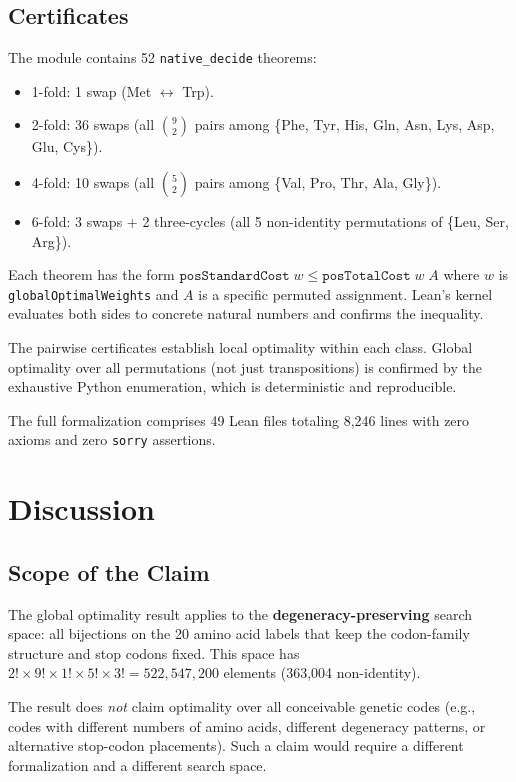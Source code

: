 \documentclass[11pt,twocolumn]{article}
\begin{document}
\subsection{Certificates}

The module contains 52 \texttt{native\_decide} theorems:
\begin{itemize}
\item 1-fold: 1 swap (Met $\leftrightarrow$ Trp).
\item 2-fold: 36 swaps (all $\binom{9}{2}$ pairs among \{Phe, Tyr,
  His, Gln, Asn, Lys, Asp, Glu, Cys\}).
\item 4-fold: 10 swaps (all $\binom{5}{2}$ pairs among \{Val, Pro, Thr,
  Ala, Gly\}).
\item 6-fold: 3 swaps + 2 three-cycles (all 5 non-identity permutations
  of \{Leu, Ser, Arg\}).
\end{itemize}
Each theorem has the form
$\texttt{posStandardCost}\; w \leq \texttt{posTotalCost}\; w\; A$
where $w$ is \texttt{globalOptimalWeights} and $A$ is a specific
permuted assignment. Lean's kernel evaluates both sides to concrete
natural numbers and confirms the inequality.

The pairwise certificates establish local optimality within each class.
Global optimality over all permutations (not just transpositions) is
confirmed by the exhaustive Python enumeration, which is deterministic
and reproducible.

The full formalization comprises 49 Lean files totaling 8,246 lines
with zero axioms and zero \texttt{sorry} assertions.

\section{Discussion}

\subsection{Scope of the Claim}

The global optimality result applies to the
\textbf{degeneracy-preserving} search space: all bijections on the 20
amino acid labels that keep the codon-family structure and stop codons
fixed. This space has $2! \times 9! \times 1! \times 5! \times 3! =
522{,}547{,}200$ elements (363,004 non-identity).

The result does \emph{not} claim optimality over all conceivable genetic
codes (e.g., codes with different numbers of amino acids, different
degeneracy patterns, or alternative stop-codon placements). Such a claim
would require a different formalization and a different search space.
\end{document}
